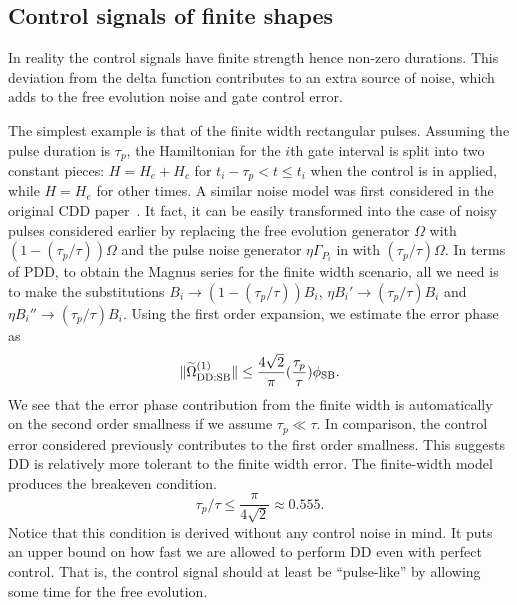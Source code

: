 \documentclass[b5paper,11pt]{article}
\newcommand{\wt}[1]{\widetilde{#1}}
\newcommand{\rDD}{\mathrm{DD}}
\begin{document}
\subsection{Control signals of finite shapes}
In reality the control signals have finite strength hence non-zero durations.
This deviation from the delta function contributes to an extra source of noise, which adds to the free evolution noise and gate control error. 




The simplest example is that of the finite width rectangular pulses. Assuming the pulse duration is $\tau_p$, the Hamiltonian  for the $i$th gate interval is split into two constant pieces: $H=H_e+H_c$ for $t_i -\tau_p  < t \le t_{i}$ when the control is in applied, while $H=H_e$ for other times. 
A similar noise model was first considered in the original CDD paper~\!\cite{khodjasteh2007performance}. It fact, it can be easily transformed into the 
case of noisy pulses considered earlier by replacing the free evolution generator $\Omega$ with $ (1-(\tau_p/\tau)) \Omega$ and the pulse noise generator $\eta \Gamma_{P_i}$ in  with $(\tau_p/\tau) \Omega$. In terms of PDD, to obtain the Magnus series for the finite width scenario, all we need is to make the substitutions $B_i \to (1-(\tau_p/\tau)) B_i$, $\eta B_i' \to (\tau_p/\tau) B_i$ and $\eta B_i'' \to (\tau_p/\tau) B_i$. Using the first order expansion, we estimate the error phase as 
\begin{equation}
\norm{ \wt\Omega_{\rDD:\rSB}\up{1} }\le \frac{4\sqrt{2}}{\pi} (\frac{\tau_p}{\tau})\phi_\rSB.
\end{equation}
We see that the error phase contribution from the finite width is automatically on the second order smallness if we assume $\tau_p\ll \tau$. In comparison,
the control error considered previously contributes to the first order smallness. 
This suggests DD is relatively more tolerant to the finite width error. The finite-width model produces the breakeven condition.
\begin{equation}
 \tau_p/\tau \le \frac{\pi}{4\sqrt{2}}\approx 0.555.
\end{equation}
Notice that this condition is derived without any control noise in mind. It puts an upper bound on how 
fast we are allowed to perform DD even with perfect control. That is, the 
control signal should at least be ``pulse-like'' by allowing some time for the free evolution.
\end{document}

